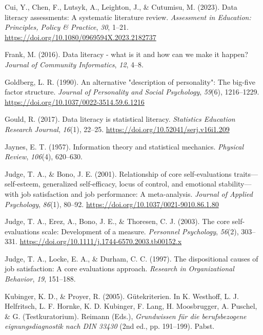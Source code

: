 \documentclass[
  12pt,
  a4paper,
  twoside]{article}
\newlength{\cslhangindent}
\newlength{\cslentryspacingunit} %
\newenvironment{CSLReferences}[2] %
 {%
  \setlength{\parindent}{0pt}
  \ifodd #1
  \let\oldpar\par
  \def\par{\hangindent=\cslhangindent\oldpar}
  \fi
  \setlength{\parskip}{#2\cslentryspacingunit}
 }%
 {}
\begin{document}
\begin{CSLReferences}{1}{0}
\leavevmode{}%
Cui, Y., Chen, F., Lutsyk, A., Leighton, J., \& Cutumisu, M. (2023). Data literacy assessments: A systematic literature review. \emph{Assessment in Education: Principles, Policy \& Practice}, \emph{30}, 1--21. \url{https://doi.org/10.1080/0969594X.2023.2182737}

\leavevmode{}%
Frank, M. (2016). Data literacy - what is it and how can we make it happen? \emph{Journal of Community Informatics}, \emph{12}, 4--8.

\leavevmode{}%
Goldberg, L. R. (1990). An alternative "description of personality": The big-five factor structure. \emph{Journal of Personality and Social Psychology}, \emph{59}(6), 1216--1229. \url{https://doi.org/10.1037/0022-3514.59.6.1216}

\leavevmode{}%
Gould, R. (2017). Data literacy is statistical literacy. \emph{Statistics Education Research Journal}, \emph{16}(1), 22--25. \url{https://doi.org/10.52041/serj.v16i1.209}

\leavevmode{}%
Jaynes, E. T. (1957). Information theory and statistical mechanics. \emph{Physical Review}, \emph{106}(4), 620--630.

\leavevmode{}%
Judge, T. A., \& Bono, J. E. (2001). Relationship of core self-evaluations traits---self-esteem, generalized self-efficacy, locus of control, and emotional stability---with job satisfaction and job performance: A meta-analysis. \emph{Journal of Applied Psychology}, \emph{86}(1), 80--92. \url{https://doi.org/10.1037/0021-9010.86.1.80}

\leavevmode{}%
Judge, T. A., Erez, A., Bono, J. E., \& Thoresen, C. J. (2003). The core self-evaluations scale: Development of a measure. \emph{Personnel Psychology}, \emph{56}(2), 303--331. \url{https://doi.org/10.1111/j.1744-6570.2003.tb00152.x}

\leavevmode{}%
Judge, T. A., Locke, E. A., \& Durham, C. C. (1997). The dispositional causes of job satisfaction: A core evaluations approach. \emph{Research in Organizational Behavior}, \emph{19}, 151--188.

\leavevmode{}%
Kubinger, K. D., \& Proyer, R. (2005). Gütekriterien. In K. Westhoff, L. J. Helfritsch, L. F. Hornke, K. D. Kubinger, F. Lang, H. Moosbrugger, A. Puschel, \& G. (Testkuratorium). Reimann (Eds.), \emph{Grundwissen für die berufsbezogene eignungsdiagnostik nach DIN 33430} (2nd ed., pp. 191--199). Pabst.


\end{CSLReferences}
\end{document}
